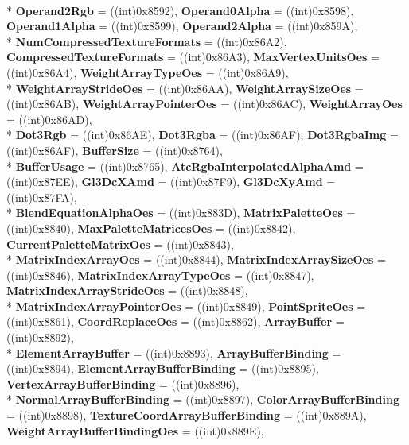 \begin{DoxyCompactItemize}
\\*
{\bfseries Operand2\-Rgb} = ((int)0x8592), 
{\bfseries Operand0\-Alpha} = ((int)0x8598), 
{\bfseries Operand1\-Alpha} = ((int)0x8599), 
{\bfseries Operand2\-Alpha} = ((int)0x859\-A), 
\\*
{\bfseries Num\-Compressed\-Texture\-Formats} = ((int)0x86\-A2), 
{\bfseries Compressed\-Texture\-Formats} = ((int)0x86\-A3), 
{\bfseries Max\-Vertex\-Units\-Oes} = ((int)0x86\-A4), 
{\bfseries Weight\-Array\-Type\-Oes} = ((int)0x86\-A9), 
\\*
{\bfseries Weight\-Array\-Stride\-Oes} = ((int)0x86\-A\-A), 
{\bfseries Weight\-Array\-Size\-Oes} = ((int)0x86\-A\-B), 
{\bfseries Weight\-Array\-Pointer\-Oes} = ((int)0x86\-A\-C), 
{\bfseries Weight\-Array\-Oes} = ((int)0x86\-A\-D), 
\\*
{\bfseries Dot3\-Rgb} = ((int)0x86\-A\-E), 
{\bfseries Dot3\-Rgba} = ((int)0x86\-A\-F), 
{\bfseries Dot3\-Rgba\-Img} = ((int)0x86\-A\-F), 
{\bfseries Buffer\-Size} = ((int)0x8764), 
\\*
{\bfseries Buffer\-Usage} = ((int)0x8765), 
{\bfseries Atc\-Rgba\-Interpolated\-Alpha\-Amd} = ((int)0x87\-E\-E), 
{\bfseries Gl3\-Dc\-X\-Amd} = ((int)0x87\-F9), 
{\bfseries Gl3\-Dc\-Xy\-Amd} = ((int)0x87\-F\-A), 
\\*
{\bfseries Blend\-Equation\-Alpha\-Oes} = ((int)0x883\-D), 
{\bfseries Matrix\-Palette\-Oes} = ((int)0x8840), 
{\bfseries Max\-Palette\-Matrices\-Oes} = ((int)0x8842), 
{\bfseries Current\-Palette\-Matrix\-Oes} = ((int)0x8843), 
\\*
{\bfseries Matrix\-Index\-Array\-Oes} = ((int)0x8844), 
{\bfseries Matrix\-Index\-Array\-Size\-Oes} = ((int)0x8846), 
{\bfseries Matrix\-Index\-Array\-Type\-Oes} = ((int)0x8847), 
{\bfseries Matrix\-Index\-Array\-Stride\-Oes} = ((int)0x8848), 
\\*
{\bfseries Matrix\-Index\-Array\-Pointer\-Oes} = ((int)0x8849), 
{\bfseries Point\-Sprite\-Oes} = ((int)0x8861), 
{\bfseries Coord\-Replace\-Oes} = ((int)0x8862), 
{\bfseries Array\-Buffer} = ((int)0x8892), 
\\*
{\bfseries Element\-Array\-Buffer} = ((int)0x8893), 
{\bfseries Array\-Buffer\-Binding} = ((int)0x8894), 
{\bfseries Element\-Array\-Buffer\-Binding} = ((int)0x8895), 
{\bfseries Vertex\-Array\-Buffer\-Binding} = ((int)0x8896), 
\\*
{\bfseries Normal\-Array\-Buffer\-Binding} = ((int)0x8897), 
{\bfseries Color\-Array\-Buffer\-Binding} = ((int)0x8898), 
{\bfseries Texture\-Coord\-Array\-Buffer\-Binding} = ((int)0x889\-A), 
{\bfseries Weight\-Array\-Buffer\-Binding\-Oes} = ((int)0x889\-E), 

\end{DoxyCompactItemize}
